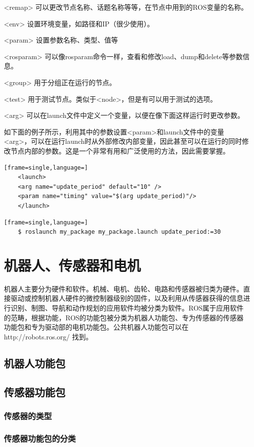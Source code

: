 \documentclass[geye,green,kindle,cn]{elegantnote}
\begin{document}
<remap>  可以更改节点名称、话题名称等等，在节点中用到的ROS变量的名称。

<env>  设置环境变量，如路径和IP（很少使用）。

<param>  设置参数名称、类型、值等

<rosparam>  可以像rosparam命令一样，查看和修改load、dump和delete等参数信息。

<group>  用于分组正在运行的节点。

<test>  用于测试节点。类似于<node>，但是有可以用于测试的选项。

<arg>  可以在launch文件中定义一个变量，以便在像下面这样运行时更改参数。

如下面的例子所示，利用其中的参数设置<param>和launch文件中的变量<arg>，可以在运行launch时从外部修改内部变量，因此甚至可以在运行的同时修改节点内部的参数。这是一个非常有用和广泛使用的方法，因此需要掌握。

\begin{lstlisting}[frame=single,language=]
    <launch>   
    <arg name="update_period" default="10" />  
    <param name="timing" value="$(arg update_period)"/> 
    </launch> 
\end{lstlisting}

\begin{lstlisting}[frame=single,language=]
    $ roslaunch my_package my_package.launch update_period:=30
\end{lstlisting}
\section{机器人、传感器和电机}
机器人主要分为硬件和软件。机械、电机、齿轮、电路和传感器被归类为硬件。直接驱动或控制机器人硬件的微控制器级别的固件，以及利用从传感器获得的信息进行识别、制图、导航和动作规划的应用软件均被分类为软件。ROS属于应用软件的范畴，根据功能，ROS的功能包被分类为机器人功能包、专为传感器的传感器功能包和专为驱动部的电机功能包。公共机器人功能包可以在http://robots.ros.org/ 找到。
\subsection{机器人功能包}
\subsection{传感器功能包}
\subsubsection{传感器的类型}
\subsubsection{传感器功能包的分类}
\end{document}
